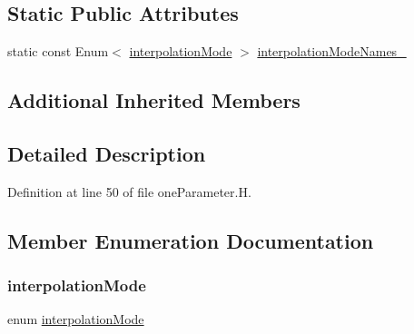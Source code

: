 \subsection*{Static Public Attributes}
\begin{DoxyCompactItemize}
\item 
static const Enum$<$ \hyperlink{classFoam_1_1regimeMapModels_1_1oneParameter_afe565d09517c0dde1ad7c89017837d93}{interpolation\+Mode} $>$ \hyperlink{classFoam_1_1regimeMapModels_1_1oneParameter_a4a3e0fcb79dec9c0ad6f3f91bafbfd33}{interpolation\+Mode\+Names\+\_\+}
\end{DoxyCompactItemize}
\subsection*{Additional Inherited Members}


\subsection{Detailed Description}


Definition at line 50 of file one\+Parameter.\+H.



\subsection{Member Enumeration Documentation}
\mbox{\label{classFoam_1_1regimeMapModels_1_1oneParameter_afe565d09517c0dde1ad7c89017837d93}} 
\subsubsection{\texorpdfstring{interpolation\+Mode}{interpolationMode}}
{\footnotesize\ttfamily enum \hyperlink{classFoam_1_1regimeMapModels_1_1oneParameter_afe565d09517c0dde1ad7c89017837d93}{interpolation\+Mode}\hspace{0.3cm}{\ttfamily [strong]}}

